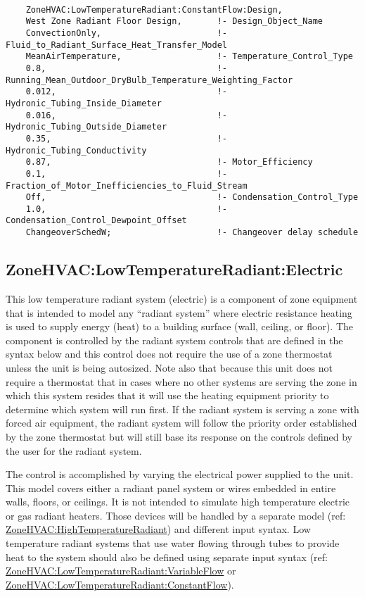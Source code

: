 \begin{lstlisting}
	
	ZoneHVAC:LowTemperatureRadiant:ConstantFlow:Design,
	West Zone Radiant Floor Design,       !- Design_Object_Name
	ConvectionOnly,                       !- Fluid_to_Radiant_Surface_Heat_Transfer_Model
	MeanAirTemperature,                   !- Temperature_Control_Type
	0.8,                                  !- Running_Mean_Outdoor_DryBulb_Temperature_Weighting_Factor
	0.012,                                !- Hydronic_Tubing_Inside_Diameter
	0.016,                                !- Hydronic_Tubing_Outside_Diameter
	0.35,                                 !- Hydronic_Tubing_Conductivity
	0.87,                                 !- Motor_Efficiency
	0.1,                                  !- Fraction_of_Motor_Inefficiencies_to_Fluid_Stream
	Off,                                  !- Condensation_Control_Type
	1.0,                                  !- Condensation_Control_Dewpoint_Offset
	ChangeoverSchedW;                     !- Changeover delay schedule
\end{lstlisting}


\subsection{ZoneHVAC:LowTemperatureRadiant:Electric}\label{zonehvaclowtemperatureradiantelectric}

This low temperature radiant system (electric) is a component of zone equipment that is intended to model any ``radiant system'' where electric resistance heating is used to supply energy (heat) to a building surface (wall, ceiling, or floor). The component is controlled by the radiant system controls that are defined in the syntax below and this control does not require the use of a zone thermostat unless the unit is being autosized. Note also that because this unit does not require a thermostat that in cases where no other systems are serving the zone in which this system resides that it will use the heating equipment priority to determine which system will run first. If the radiant system is serving a zone with forced air equipment, the radiant system will follow the priority order established by the zone thermostat but will still base its response on the controls defined by the user for the radiant system.

The control is accomplished by varying the electrical power supplied to the unit. This model covers either a radiant panel system or wires embedded in entire walls, floors, or ceilings. It is not intended to simulate high temperature electric or gas radiant heaters. Those devices will be handled by a separate model (ref: \hyperref[zonehvachightemperatureradiant]{ZoneHVAC:HighTemperatureRadiant}) and different input syntax. Low temperature radiant systems that use water flowing through tubes to provide heat to the system should also be defined using separate input syntax (ref: \hyperref[zonehvaclowtemperatureradiantvariableflow]{ZoneHVAC:LowTemperatureRadiant:VariableFlow} or \hyperref[zonehvaclowtemperatureradiantconstantflow]{ZoneHVAC:LowTemperatureRadiant:ConstantFlow}).


